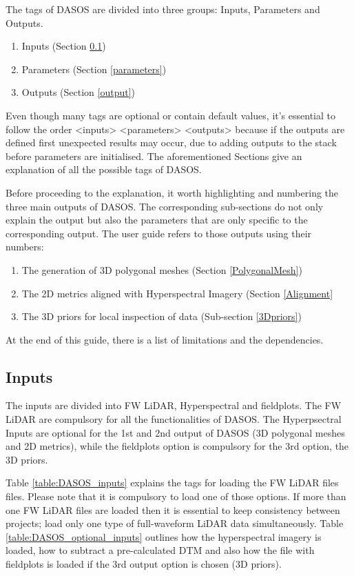 \documentclass{article}
\begin{document}
	\par The tags of DASOS are divided into three groups: Inputs, Parameters and Outputs. 
		\begin{enumerate}
			\item Inputs (Section \ref{inputs})
			\item Parameters (Section \ref{parameters})
			\item Outputs (Section \ref{output})
		\end{enumerate} 
	\par Even though many tags are optional or contain default values, it's essential to follow the order <inputs> <parameters> <outputs> because if the outputs are defined first unexpected results may occur, due to adding outputs to the stack before parameters are initialised. The aforementioned Sections give an explanation of all the possible tags of DASOS. 
	
	\par Before proceeding to the explanation, it worth highlighting and numbering the three main outputs of DASOS. The corresponding sub-sections do not only explain the output but also the parameters that are only specific to the corresponding output. The user guide refers to those outputs using their numbers:
	
	\begin{enumerate}
			\item The generation of 3D polygonal meshes (Section \ref{PolygonalMesh})
			\item The 2D metrics aligned with Hyperspectral Imagery (Section \ref{Alignment}
			\item The 3D priors for local inspection of data (Sub-section \ref{3Dpriors})		
	\end{enumerate}
	
		At the end of this guide, there is a list of limitations and the dependencies. 
	
	\subsection{Inputs}\label{inputs}
	\par The inputs are divided into FW LiDAR, Hyperspectral and fieldplots. The FW LiDAR are compulsory for all the functionalities of DASOS. The Hyperpsectral Inputs are optional for the 1st and 2nd output of DASOS (3D polygonal meshes and 2D metrics), while the fieldplots option is compulsory for the 3rd option, the 3D priors. 
	
	\par Table  \ref{table:DASOS_inputs} explains the tags for loading the FW LiDAR files files. Please note that it is compulsory to load one of those options. If more than one FW LiDAR files are loaded then it is essential to keep consistency between projects; load only one type of full-waveform LiDAR data simultaneously. Table \ref{table:DASOS_optional_inputs} outlines how the hyperspectral imagery is loaded, how to subtract a pre-calculated DTM and also how the file with fieldplots is loaded if the 3rd output option is chosen (3D priors).
	
\end{document}
